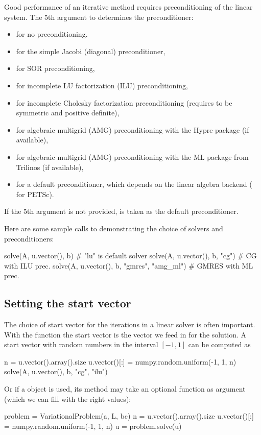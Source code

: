 Good performance of an iterative method requires preconditioning of
the linear system. The 5th argument to  determines the
preconditioner:
\begin{itemize}
\item {} for no preconditioning.
\item {} for the simple Jacobi (diagonal) preconditioner,
\item {} for SOR preconditioning,
\item {} for incomplete LU factorization (ILU) preconditioning,
\item {} for incomplete Cholesky factorization preconditioning
(requires  to be symmetric and positive definite),
\item {} for algebraic multigrid (AMG) preconditioning
with the Hypre package (if available),
\item {} for algebraic multigrid (AMG) preconditioning
with the ML package from Trilinos (if available),
\item {} for a default preconditioner, which depends
on the linear algebra backend ( for PETSc).
\end{itemize}
If the 5th argument is not provided,  is taken as the default
preconditioner.

Here are some sample calls to  demonstrating the choice
of solvers and preconditioners:
\begin{python}
solve(A, u.vector(), b)         # "lu" is default solver
solve(A, u.vector(), b, "cg")   # CG with ILU prec.
solve(A, u.vector(), b, "gmres", "amg_ml")  # GMRES with ML prec.
\end{python}

\subsection{Setting the start vector}

The choice of start vector for the iterations in a linear solver is often
important. With the  function the start vector
is the vector we feed in for the solution. A start vector
with random numbers in the interval $[-1,1]$ can be computed as
\begin{python}
n = u.vector().array().size
u.vector()[:] = numpy.random.uniform(-1, 1, n)
solve(A, u.vector(), b, "cg", "ilu")
\end{python}
Or if a  object is used, its 
method may take an optional  function as argument (which we
can fill with the right values):
\begin{python}
problem = VariationalProblem(a, L, bc)
n = u.vector().array().size
u.vector()[:] = numpy.random.uniform(-1, 1, n)
u = problem.solve(u)
\end{python}

